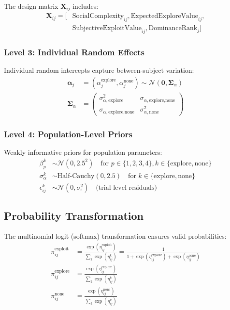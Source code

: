\documentclass[11pt]{article}
\begin{document}
The design matrix $\boldsymbol{X}_{ij}$ includes:
\begin{align}
\boldsymbol{X}_{ij} = [&\text{SocialComplexity}_{ij}, \text{ExpectedExploreValue}_{ij}, \nonumber\\
&\text{SubjectiveExploitValue}_{ij}, \text{DominanceRank}_{j}] \label{eq:design_matrix}
\end{align}

\subsubsection{Level 3: Individual Random Effects}
Individual random intercepts capture between-subject variation:
\begin{align}
\boldsymbol{\alpha}_{j} &= (\alpha_{j}^{\text{explore}}, \alpha_{j}^{\text{none}}) \sim \mathcal{N}(\boldsymbol{0}, \boldsymbol{\Sigma}_{\alpha}) \label{eq:random_effects}\\
\boldsymbol{\Sigma}_{\alpha} &= \begin{pmatrix}
\sigma_{\alpha,\text{explore}}^2 & \sigma_{\alpha,\text{explore,none}} \\
\sigma_{\alpha,\text{explore,none}} & \sigma_{\alpha,\text{none}}^2
\end{pmatrix} \label{eq:covariance_matrix}
\end{align}

\subsubsection{Level 4: Population-Level Priors}
Weakly informative priors for population parameters:
\begin{align}
\beta_{p}^{k} &\sim \mathcal{N}(0, 2.5^2) \quad \text{for } p \in \{1,2,3,4\}, k \in \{\text{explore}, \text{none}\} \label{eq:beta_priors}\\
\sigma_{\alpha}^{k} &\sim \text{Half-Cauchy}(0, 2.5) \quad \text{for } k \in \{\text{explore}, \text{none}\} \label{eq:sigma_priors}\\
\epsilon_{ij}^{k} &\sim \mathcal{N}(0, \sigma_{\epsilon}^{2}) \quad \text{(trial-level residuals)} \label{eq:residual_priors}
\end{align}

\subsection{Probability Transformation}
The multinomial logit (softmax) transformation ensures valid probabilities:
\begin{align}
\pi_{ij}^{\text{exploit}} &= \frac{\exp(\eta_{ij}^{\text{exploit}})}{\sum_{k} \exp(\eta_{ij}^{k})} = \frac{1}{1 + \exp(\eta_{ij}^{\text{explore}}) + \exp(\eta_{ij}^{\text{none}})} \label{eq:prob_exploit}\\
\pi_{ij}^{\text{explore}} &= \frac{\exp(\eta_{ij}^{\text{explore}})}{\sum_{k} \exp(\eta_{ij}^{k})} \label{eq:prob_explore}\\
\pi_{ij}^{\text{none}} &= \frac{\exp(\eta_{ij}^{\text{none}})}{\sum_{k} \exp(\eta_{ij}^{k})} \label{eq:prob_none}
\end{align}
\end{document}
